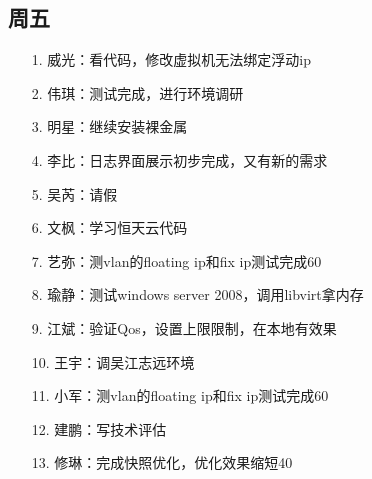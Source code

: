 \documentclass[a4paper,left=1.5cm,right=1.5cm,11pt]{article}
\begin{document}
\subsection{周五}
    \begin{itemize}
       \item[1.]威光：看代码，修改虚拟机无法绑定浮动ip
		\item[2.]伟琪：测试完成，进行环境调研
		\item[3.]明星：继续安装裸金属
		\item[4.]李比：日志界面展示初步完成，又有新的需求
		\item[5.]吴芮：请假
		\item[6.]文枫：学习恒天云代码
		\item[7.]艺弥：测vlan的floating ip和fix ip测试完成60%
		\item[8.]瑜静：测试windows server 2008，调用libvirt拿内存
		\item[9.]江斌：验证Qos，设置上限限制，在本地有效果
		\item[10.]王宇：调吴江志远环境
		\item[11.]小军：测vlan的floating ip和fix ip测试完成60%
		\item[12.]建鹏：写技术评估
		\item[13.]修琳：完成快照优化，优化效果缩短40%
    \end{itemize}
\end{document}
